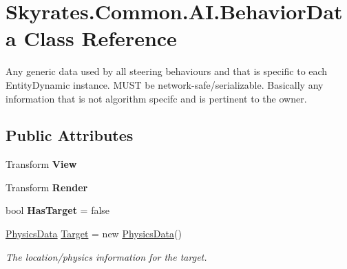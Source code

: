 \hypertarget{class_skyrates_1_1_common_1_1_a_i_1_1_behavior_data}{\section{Skyrates.\-Common.\-A\-I.\-Behavior\-Data Class Reference}
\label{class_skyrates_1_1_common_1_1_a_i_1_1_behavior_data}
}


Any generic data used by all steering behaviours and that is specific to each Entity\-Dynamic instance. M\-U\-S\-T be network-\/safe/serializable. Basically any information that is not algorithm specifc and is pertinent to the owner.  


\subsection*{Public Attributes}
\begin{DoxyCompactItemize}
\item 
\hypertarget{class_skyrates_1_1_common_1_1_a_i_1_1_behavior_data_a0f402310f443c9634eb9c875e5e96014}{Transform {\bfseries View}}\label{class_skyrates_1_1_common_1_1_a_i_1_1_behavior_data_a0f402310f443c9634eb9c875e5e96014}

\item 
\hypertarget{class_skyrates_1_1_common_1_1_a_i_1_1_behavior_data_a000103bbe16678cd6f962ba5d67e48a9}{Transform {\bfseries Render}}\label{class_skyrates_1_1_common_1_1_a_i_1_1_behavior_data_a000103bbe16678cd6f962ba5d67e48a9}

\item 
\hypertarget{class_skyrates_1_1_common_1_1_a_i_1_1_behavior_data_a282a3b62a9bf40a5e617e58020b6ce96}{bool {\bfseries Has\-Target} = false}\label{class_skyrates_1_1_common_1_1_a_i_1_1_behavior_data_a282a3b62a9bf40a5e617e58020b6ce96}

\item 
\hyperlink{class_skyrates_1_1_common_1_1_a_i_1_1_physics_data}{Physics\-Data} \hyperlink{class_skyrates_1_1_common_1_1_a_i_1_1_behavior_data_a0016ce570450bebed638dfc26459490c}{Target} = new \hyperlink{class_skyrates_1_1_common_1_1_a_i_1_1_physics_data}{Physics\-Data}()
\begin{DoxyCompactList}\small\item\em The location/physics information for the target. \end{DoxyCompactList}\end{DoxyCompactItemize}


